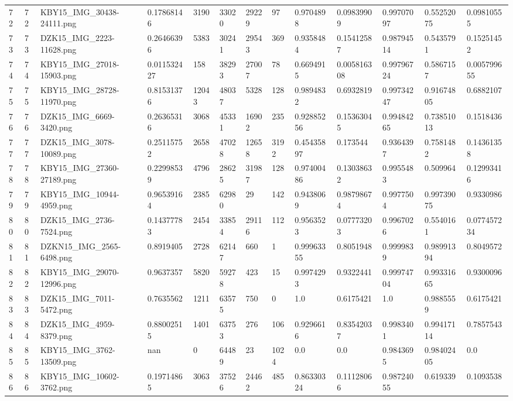 \documentclass[11pt, a4paper, twoside]{report}
\begin{document}
\begin{longtable}[c]{@{}lllllllllllll@{}}
72 & 72 & KBY15\_IMG\_30438-24111.png & 0.17868146 & 3190 & 33020 & 29229 & 97 & 0.9704898 & 0.09839909 & 0.99707097 & 0.55252075 & 0.09810555 \\
73 & 73 & DZK15\_IMG\_2223-11628.png & 0.26466396 & 5383 & 30241 & 29543 & 369 & 0.9358484 & 0.15412587 & 0.98794514 & 0.5435791 & 0.15251452 \\
74 & 74 & KBY15\_IMG\_27018-15903.png & 0.011532427 & 158 & 38293 & 27007 & 78 & 0.6694915 & 0.005816308 & 0.99796724 & 0.5867157 & 0.005799655 \\
75 & 75 & KBY15\_IMG\_28728-11970.png & 0.81531376 & 12043 & 48037 & 5328 & 128 & 0.9894832 & 0.6932819 & 0.99734247 & 0.91674805 & 0.6882107 \\
76 & 76 & DZK15\_IMG\_6669-3420.png & 0.26365316 & 3068 & 45331 & 16902 & 235 & 0.92885256 & 0.15363045 & 0.99484265 & 0.73851013 & 0.1518436 \\
77 & 77 & DZK15\_IMG\_3078-10089.png & 0.25115752 & 2658 & 47028 & 12658 & 3192 & 0.45435897 & 0.173544 & 0.9364397 & 0.7581482 & 0.14361358 \\
78 & 78 & KBY15\_IMG\_27360-27189.png & 0.22998539 & 4796 & 28625 & 31987 & 128 & 0.97400486 & 0.13038632 & 0.9955483 & 0.509964 & 0.12993416 \\
79 & 79 & KBY15\_IMG\_10944-4959.png & 0.96539164 & 2385 & 62980 & 29 & 142 & 0.9438069 & 0.98798674 & 0.9977504 & 0.99739075 & 0.9330986 \\
80 & 80 & DZK15\_IMG\_2736-7524.png & 0.14377783 & 2454 & 33854 & 29116 & 112 & 0.9563523 & 0.07773203 & 0.9967026 & 0.5540161 & 0.077457234 \\
81 & 81 & DZKN15\_IMG\_2565-6498.png & 0.8919405 & 2728 & 62147 & 660 & 1 & 0.99963355 & 0.8051948 & 0.9999839 & 0.98991394 & 0.8049572 \\
82 & 82 & KBY15\_IMG\_29070-12996.png & 0.9637357 & 5820 & 59278 & 423 & 15 & 0.9974293 & 0.9322441 & 0.99974704 & 0.99331665 & 0.9300096 \\
83 & 83 & DZK15\_IMG\_7011-5472.png & 0.7635562 & 1211 & 63575 & 750 & 0 & 1.0 & 0.6175421 & 1.0 & 0.9885559 & 0.6175421 \\
84 & 84 & DZK15\_IMG\_4959-8379.png & 0.88002515 & 1401 & 63753 & 276 & 106 & 0.9296616 & 0.83542037 & 0.9983401 & 0.99417114 & 0.7857543 \\
85 & 85 & KBY15\_IMG\_3762-13509.png & nan & 0 & 64489 & 23 & 1024 & 0.0 & 0.0 & 0.9843695 & 0.98402405 & 0.0 \\
86 & 86 & KBY15\_IMG\_10602-3762.png & 0.19714865 & 3063 & 37526 & 24462 & 485 & 0.86330324 & 0.11128066 & 0.98724055 & 0.619339 & 0.1093538 \\

\end{longtable}
\end{document}
